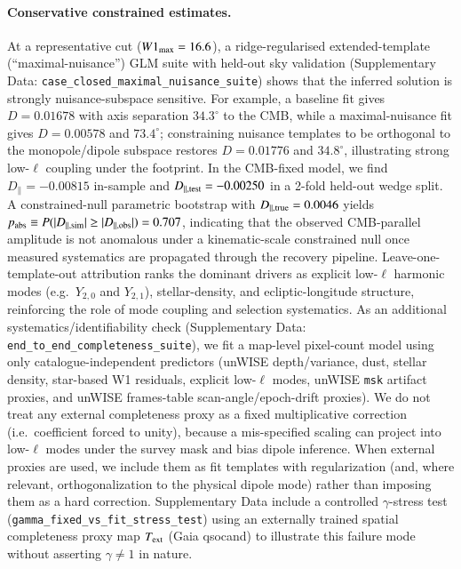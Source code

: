 \documentclass[fleqn,usenatbib]{mnras}
\begin{document}
\paragraph{Conservative constrained estimates.}
At a representative cut ($W1_{\rm max}=16.6$), a ridge-regularised extended-template (``maximal-nuisance'') GLM suite with held-out sky validation (Supplementary Data: \texttt{case\_closed\_maximal\_nuisance\_suite}) shows that the inferred solution is strongly nuisance-subspace sensitive.
For example, a baseline fit gives $D=0.01678$ with axis separation $34.3^\circ$ to the CMB, while a maximal-nuisance fit gives $D=0.00578$ and $73.4^\circ$; constraining nuisance templates to be orthogonal to the monopole/dipole subspace restores $D=0.01776$ and $34.8^\circ$, illustrating strong low-$\ell$ coupling under the footprint.
In the CMB-fixed model, we find $D_{\parallel}=-0.00815$ in-sample and $D_{\parallel,{\rm test}}=-0.00250$ in a 2-fold held-out wedge split.
A constrained-null parametric bootstrap with $D_{\parallel,{\rm true}}=0.0046$ yields $p_{\rm abs}\equiv P(|D_{\parallel,{\rm sim}}|\ge |D_{\parallel,{\rm obs}}|)=0.707$, indicating that the observed CMB-parallel amplitude is not anomalous under a kinematic-scale constrained null once measured systematics are propagated through the recovery pipeline.
Leave-one-template-out attribution ranks the dominant drivers as explicit low-$\ell$ harmonic modes (e.g.\ $Y_{2,0}$ and $Y_{2,1}$), stellar-density, and ecliptic-longitude structure, reinforcing the role of mode coupling and selection systematics.
As an additional systematics/identifiability check (Supplementary Data: \texttt{end\_to\_end\_completeness\_suite}), we fit a map-level pixel-count model using only catalogue-independent predictors (unWISE depth/variance, dust, stellar density, star-based W1 residuals, explicit low-$\ell$ modes, unWISE \texttt{msk} artifact proxies, and unWISE frames-table scan-angle/epoch-drift proxies).
We do not treat any external completeness proxy as a fixed multiplicative correction (i.e.\ coefficient forced to unity), because a mis-specified scaling can project into low-$\ell$ modes under the survey mask and bias dipole inference.
When external proxies are used, we include them as fit templates with regularization (and, where relevant, orthogonalization to the physical dipole mode) rather than imposing them as a hard correction.
Supplementary Data include a controlled $\gamma$-stress test (\texttt{gamma\_fixed\_vs\_fit\_stress\_test}) using an externally trained spatial completeness proxy map $T_{\rm ext}$ (Gaia qsocand) to illustrate this failure mode without asserting $\gamma\neq1$ in nature.
\end{document}
